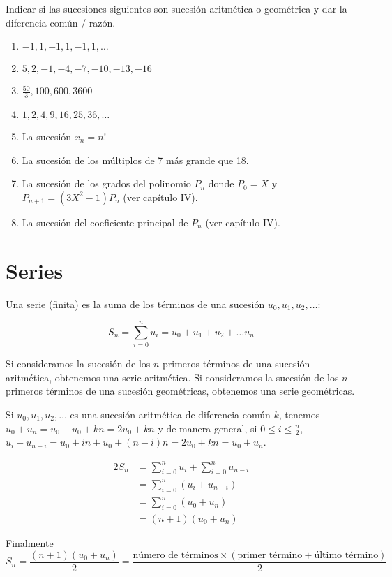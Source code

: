 Indicar si las sucesiones siguientes son sucesión aritmética o geométrica y
dar la diferencia común / razón.

\begin{enumerate}
\item $-1, 1, -1, 1, -1, 1, \ldots$
\item $5, 2, -1, -4, -7, -10, -13, -16$
\item $\frac{50}{3}, 100, 600, 3600$
\item $1, 2, 4, 9, 16, 25, 36, \ldots$
\item La sucesión $x_n = n!$
\item La sucesión de los múltiplos de 7 más grande que 18.
\item La sucesión de los grados del polinomio $P_n$ donde
  $P_0 = X$ y $P_{n+1} = {(3X^2 - 1)} P_n$ (ver capítulo IV).
\item La sucesión del coeficiente principal de $P_n$ (ver capítulo IV).
\end{enumerate}

\section{Series}

Una serie (finita) es la suma de los términos de una sucesión
$u_0, u_1, u_2, \ldots$:

$$S_n = \sum_{i=0}^n u_i = u_0 + u_1 + u_2 + \ldots u_n$$

Si consideramos la sucesión de los $n$ primeros términos de una sucesión
aritmética, obtenemos una serie aritmética. Si consideramos la sucesión de los
$n$ primeros términos de una sucesión geométricas, obtenemos una serie
geométricas.

Si $u_0, u_1, u_2, \ldots$ es una sucesión aritmética de diferencia común $k$,
tenemos $u_0 + u_n = u_0 + u_0 + kn = 2u_0 + kn$ y de manera general, si 
$0 \leq i \leq \frac{n}{2}$,
$u_i + u_{n-i} = u_0 + {in} + u_0 + {(n-i)}n = 2u_0 + kn = u_0 + u_n$.

$$
\begin{aligned}
2S_n &= \sum_{i=0}^n u_i + \sum_{i=0}^n u_{n-i}\\
     &= \sum_{i=0}^n \left(u_i + u_{n-i}\right) \\
     &= \sum_{i=0}^n {(u_0 + u_n)} \\
     &= {(n+1)}{(u_0 + u_n)}
\end{aligned}
$$

Finalmente
$$
S_n = \frac{{(n+1)}{(u_0+u_n)}}{2} =
\frac{\text{número de términos} \times
\left(\text{primer término} + \text{último término}\right)}{2}
$$

